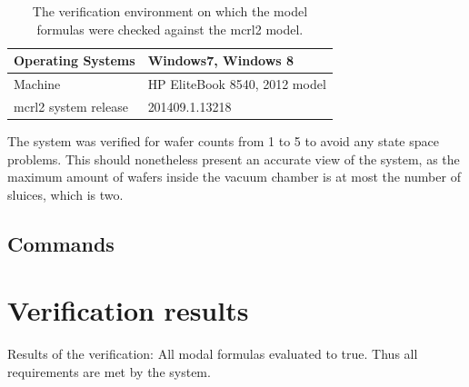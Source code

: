 \documentclass[12pt]{report}
\begin{document}
    \begin{table}[!h]
        \centering
        \begin{tabular}{|l|l|}
        \hline
            Operating Systems    & Windows7, Windows 8           \\ \hline
            Machine              & HP EliteBook 8540, 2012 model \\ \hline
            mcrl2 system release & 201409.1.13218 \\
            \hline
        \end{tabular}
        \caption{The verification environment on which the model formulas were checked against the mcrl2 model.}
        \label{ver-en}
    \end{table}

	The system was verified for wafer counts from 1 to 5 to avoid any state space problems. This should nonetheless present an accurate view of the system, as the maximum amount of wafers inside the vacuum chamber is at most the number of sluices, which is two.

    \subsection{Commands}
    
	
	\section{Verification results}
	Results of the verification: All modal formulas evaluated to true. Thus all requirements are met by the system.
	
\end{document}

